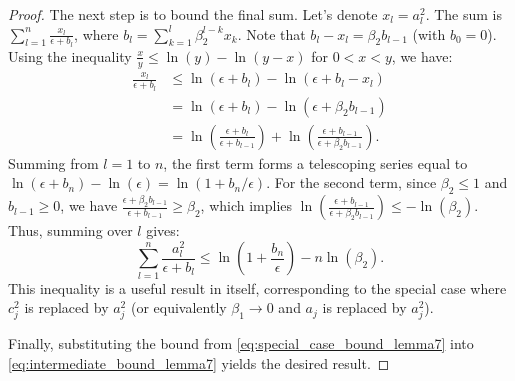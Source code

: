 \documentclass[11pt, letterpaper]{article}
\begin{document}
\begin{proof}
The next step is to bound the final sum. Let's denote $x_l = a_l^2$. The sum is $\sum_{l=1}^n \frac{x_l}{\epsilon + b_l}$, where $b_l = \sum_{k=1}^l \beta_2^{l-k}x_k$. Note that $b_l - x_l = \beta_2 b_{l-1}$ (with $b_0=0$). Using the inequality $\frac{x}{y} \leq \ln(y) - \ln(y-x)$ for $0 < x < y$, we have:
\begin{align*}
\frac{x_l}{\epsilon + b_l} &\leq \ln(\epsilon + b_l) - \ln(\epsilon + b_l - x_l) \\
&= \ln(\epsilon + b_l) - \ln(\epsilon + \beta_2 b_{l-1}) \\
&= \ln\left(\frac{\epsilon + b_l}{\epsilon + b_{l-1}}\right) + \ln\left(\frac{\epsilon + b_{l-1}}{\epsilon + \beta_2 b_{l-1}}\right).
\end{align*}
Summing from $l=1$ to $n$, the first term forms a telescoping series equal to $\ln(\epsilon + b_n) - \ln(\epsilon) = \ln(1 + b_n/\epsilon)$. For the second term, since $\beta_2 \leq 1$ and $b_{l-1} \geq 0$, we have $\frac{\epsilon + \beta_2 b_{l-1}}{\epsilon + b_{l-1}} \geq \beta_2$, which implies $\ln\left(\frac{\epsilon + b_{l-1}}{\epsilon + \beta_2 b_{l-1}}\right) \leq -\ln(\beta_2)$. Thus, summing over $l$ gives:
\begin{equation}
    \label{eq:special_case_bound_lemma7}
    \sum_{l=1}^n\frac{a_l^2}{\epsilon + b_l} \leq \ln\left(1 + \frac{b_n}{\epsilon}\right) - n\ln(\beta_2).
\end{equation}
This inequality is a useful result in itself, corresponding to the special case where $c_j^2$ is replaced by $a_j^2$ (or equivalently $\beta_1 \to 0$ and $a_j$ is replaced by $a_j^2$).

Finally, substituting the bound from \eqref{eq:special_case_bound_lemma7} into \eqref{eq:intermediate_bound_lemma7} yields the desired result.
\end{proof}
\end{document}
